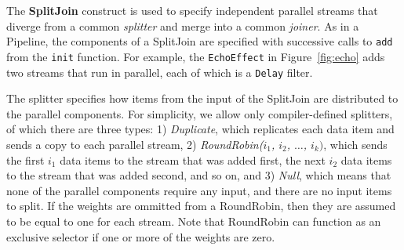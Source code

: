 
The {\bf SplitJoin} construct is used to specify independent parallel
streams that diverge from a common {\it splitter} and merge into a
common {\it joiner}.  As in a Pipeline, the components of a SplitJoin
are specified with successive calls to {\tt add} from the {\tt init}
function.  For example, the {\tt EchoEffect} in Figure~\ref{fig:echo}
adds two streams that run in parallel, each of which is a {\tt Delay}
filter.

The splitter specifies how items from the input of the SplitJoin are
distributed to the parallel components.  For simplicity, we allow only
compiler-defined splitters, of which there are three types: 1) {\it
Duplicate}, which replicates each data item and sends a copy to each
parallel stream, 2) {\it RoundRobin($i_1$, $i_2$, $\dots$, $i_k)$},
which sends the first $i_1$ data items to the stream that was added
first, the next $i_2$ data items to the stream that was added second,
and so on, and 3) {\it Null}, which means that none of the parallel
components require any input, and there are no input items to split.  If
the weights are ommitted from a RoundRobin, then they are assumed to be
equal to one for each stream.  Note that RoundRobin can function as an
exclusive selector if one or more of the weights are zero.

